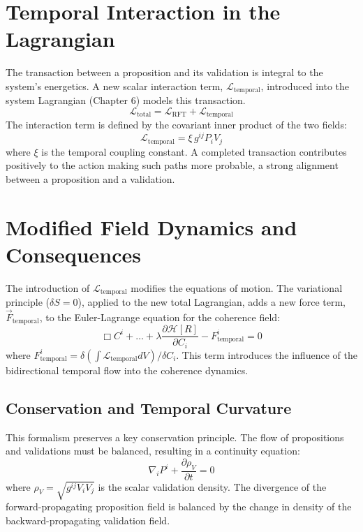 \section{Temporal Interaction in the Lagrangian}

The transaction between a proposition and its validation is integral to the system's energetics. A new scalar interaction term, \(\mathcal{L}_{\text{temporal}}\), introduced into the system Lagrangian (Chapter 6) models this transaction.
\begin{equation}
\mathcal{L}_{\text{total}} = \mathcal{L}_{\text{RFT}} + \mathcal{L}_{\text{temporal}}
\end{equation}
The interaction term is defined by the covariant inner product of the two fields:
\begin{equation}
\mathcal{L}_{\text{temporal}} = \xi \, g^{ij} P_{i} V_{j}
\end{equation}
where \(\xi\) is the temporal coupling constant. A completed transaction contributes positively to the action making such paths more probable, a strong alignment between a proposition and a validation.

\section{Modified Field Dynamics and Consequences}

The introduction of \(\mathcal{L}_{\text{temporal}}\) modifies the equations of motion. The variational principle (\(\delta S = 0\)), applied to the new total Lagrangian, adds a new force term, \(\vec{F}_{\text{temporal}}\), to the Euler-Lagrange equation for the coherence field:
\begin{equation}
\Box C^i + \dots + \lambda \frac{\partial \mathcal{H}[R]}{\partial C_i} - F^i_{\text{temporal}} = 0
\end{equation}
where \(F^i_{\text{temporal}} = \delta(\int \mathcal{L}_{\text{temporal}} dV) / \delta C_i\). This term introduces the influence of the bidirectional temporal flow into the coherence dynamics.

\subsection{Conservation and Temporal Curvature}

This formalism preserves a key conservation principle. The flow of propositions and validations must be balanced, resulting in a continuity equation:
\begin{equation}
\nabla_i P^i + \frac{\partial \rho_V}{\partial t} = 0
\end{equation}
where \(\rho_V = \sqrt{g^{ij} V_{i} V_{j}}\) is the scalar validation density. The divergence of the forward-propagating proposition field is balanced by the change in density of the backward-propagating validation field.


